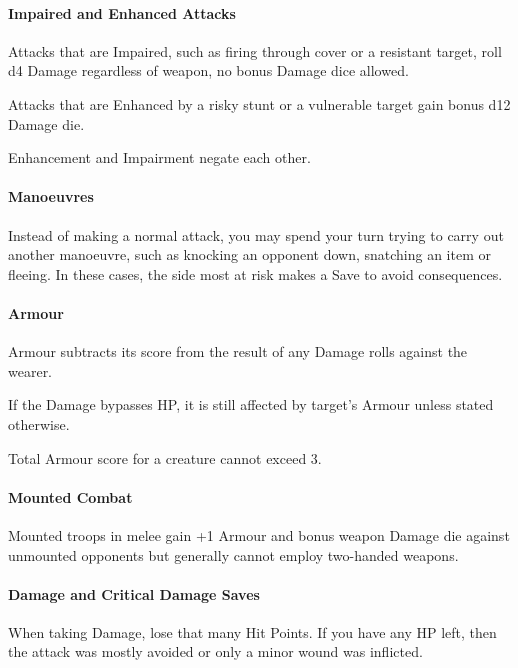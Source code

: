\documentclass[itdr]{subfiles}
\begin{document}
\vfill
\break

\paragraph{Impaired and Enhanced Attacks}
Attacks that are Impaired, such as firing through cover or a resistant target, roll d4 Damage regardless of weapon, no bonus Damage dice allowed.

Attacks that are Enhanced by a risky stunt or a vulnerable target gain bonus d12 Damage die.

Enhancement and Impairment negate each other.

\vfill
\paragraph{Manoeuvres}
Instead of making a normal attack, you may spend your turn trying to carry out another manoeuvre, such as knocking an opponent down, snatching an item or fleeing. In these cases, the side most at risk makes a Save to avoid consequences.

\vfill
\paragraph{Armour}
Armour subtracts its score from the result of any Damage rolls against the wearer.

If the Damage bypasses HP, it is still affected by target's Armour unless stated otherwise.

Total Armour score for a creature cannot exceed 3.

\vfill
\paragraph{Mounted Combat}

Mounted troops in melee gain +1 Armour and bonus weapon Damage die against unmounted opponents but generally cannot employ two-handed weapons.

\vfill
\paragraph{Damage and Critical Damage Saves}
When taking Damage, lose that many Hit Points. If you have any HP left, then the attack was mostly avoided or only a minor wound was inflicted.
\end{document}

